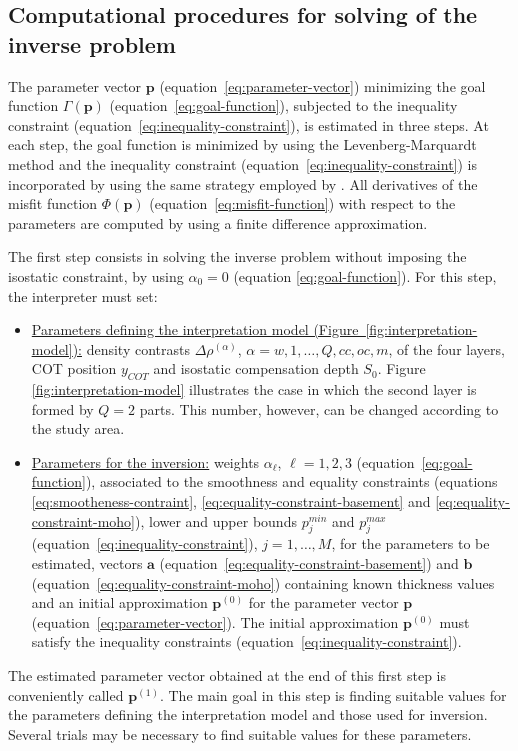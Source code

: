 \documentclass[manuscript]{geophysics}
\begin{document}
\subsection{Computational procedures for solving of the inverse problem}

The parameter vector $\mathbf{p}$ (equation~\ref{eq:parameter-vector}) minimizing the
goal function $\Gamma (\mathbf{p})$ (equation~\ref{eq:goal-function}), subjected to
the inequality constraint (equation~\ref{eq:inequality-constraint}), is estimated 
in three steps. At each step, the goal function is minimized by using the Levenberg-Marquardt 
method \citep{aster-etal2005} and the inequality constraint 
(equation~\ref{eq:inequality-constraint}) is incorporated by using the same strategy 
employed by \citet{barbosa-etal1999}.
All derivatives of the misfit function $\Phi(\mathbf{p})$ (equation~\ref{eq:misfit-function})
with respect to the parameters are computed by using a finite difference approximation.

The first step consists in solving the inverse problem without imposing the isostatic
constraint, by using $\alpha_{0} = 0$ (equation \ref{eq:goal-function}). For this step,
the interpreter must set:
\begin{itemize}
	\item \underline{Parameters defining the interpretation model
	(Figure~\ref{fig:interpretation-model}):} density contrasts $\Delta \rho^{(\alpha)}$, 
	$\alpha = w, 1, \dots, Q, cc, oc, m$, of the four layers, COT position $y_{COT}$ and
	isostatic compensation depth $S_{0}$. Figure \ref{fig:interpretation-model} illustrates 
	the case in which the second layer is formed by $Q = 2$ parts. This number, however, 
	can be changed according to the study area.
	\item \underline{Parameters for the inversion:} weights $\alpha_{\ell}$,
	$\ell = 1, 2, 3$ (equation~\ref{eq:goal-function}), associated to the 
	smoothness and equality constraints (equations \ref{eq:smootheness-contraint},
	\ref{eq:equality-constraint-basement} and \ref{eq:equality-constraint-moho}),
	lower and upper bounds $p_{j}^{min}$ and $p_{j}^{max}$
	(equation~\ref{eq:inequality-constraint}), $j = 1, \dots, M$,
	for the parameters to be estimated, vectors $\mathbf{a}$ 
	(equation~\ref{eq:equality-constraint-basement}) and $\mathbf{b}$
	(equation~\ref{eq:equality-constraint-moho}) containing known thickness values
	and an initial approximation $\mathbf{p}^{(0)}$ for the parameter vector $\mathbf{p}$
	(equation~\ref{eq:parameter-vector}). The initial approximation $\mathbf{p}^{(0)}$
	must satisfy the inequality constraints (equation~\ref{eq:inequality-constraint}).
\end{itemize}
The estimated parameter vector obtained at the end of this first step is conveniently called
$\mathbf{p}^{(1)}$. The main goal in this step is finding suitable values for the parameters
defining the interpretation model and those used for inversion. Several trials may be
necessary to find suitable values for these parameters. 
\end{document}
